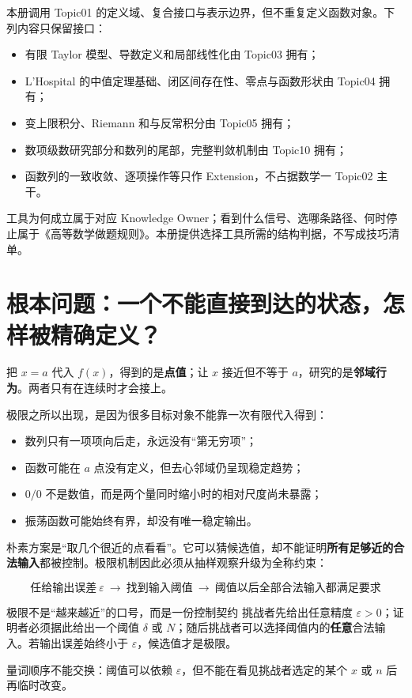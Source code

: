 \documentclass[11pt,a4paper]{ctexart}
\newcommand{\kw}[1]{\textbf{\color{deep}#1}}
\begin{document}
本册调用 Topic01 的定义域、复合接口与表示边界，但不重复定义函数对象。下列内容只保留接口：
\begin{itemize}
  \item 有限 Taylor 模型、导数定义和局部线性化由 Topic03 拥有；
  \item L'Hospital 的中值定理基础、闭区间存在性、零点与函数形状由 Topic04 拥有；
  \item 变上限积分、Riemann 和与反常积分由 Topic05 拥有；
  \item 数项级数研究部分和数列的尾部，完整判敛机制由 Topic10 拥有；
  \item 函数列的一致收敛、逐项操作等只作 Extension，不占据数学一 Topic02 主干。
\end{itemize}

工具为何成立属于对应 Knowledge Owner；看到什么信号、选哪条路径、何时停止属于《高等数学做题规则》。本册提供选择工具所需的结构判据，不写成技巧清单。

\section{根本问题：一个不能直接到达的状态，怎样被精确定义？}

把 $x=a$ 代入 $f(x)$，得到的是\kw{点值}；让 $x$ 接近但不等于 $a$，研究的是\kw{邻域行为}。两者只有在连续时才会接上。

极限之所以出现，是因为很多目标对象不能靠一次有限代入得到：
\begin{itemize}
  \item 数列只有一项项向后走，永远没有“第无穷项”；
  \item 函数可能在 $a$ 点没有定义，但去心邻域仍呈现稳定趋势；
  \item $0/0$ 不是数值，而是两个量同时缩小时的相对尺度尚未暴露；
  \item 振荡函数可能始终有界，却没有唯一稳定输出。
\end{itemize}

朴素方案是“取几个很近的点看看”。它可以猜候选值，却不能证明\textbf{所有足够近的合法输入}都被控制。极限机制因此必须从抽样观察升级为全称约束：

\[
\boxed{\text{任给输出误差}\ \varepsilon
\ \longrightarrow\ \text{找到输入阈值}
\ \longrightarrow\ \text{阈值以后全部合法输入都满足要求}}
\]

\begin{corebox}{极限不是“越来越近”的口号，而是一份控制契约}
挑战者先给出任意精度 $\varepsilon>0$；证明者必须据此给出一个阈值 $\delta$ 或 $N$；随后挑战者可以选择阈值内的\textbf{任意}合法输入。若输出误差始终小于 $\varepsilon$，候选值才是极限。

量词顺序不能交换：阈值可以依赖 $\varepsilon$，但不能在看见挑战者选定的某个 $x$ 或 $n$ 后再临时改变。
\end{corebox}
\end{document}
